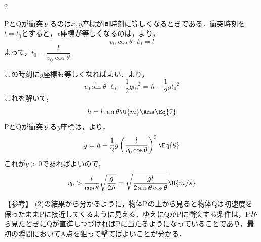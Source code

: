 \begin{multicols}{2}
\begin{komon}
 $\mathrm{P}$と$\mathrm{Q}$が衝突するのは$x,y$座標が同時刻に等しくなるときである．衝突時刻を$t=t_0$とすると，$x$座標が等しくなるのは，より，
       \[v_0\cos\theta\cdot t_0=l\]
       よって，$t_0=\dfrac{l}{v_0\cos\theta}$\par
       \hspace{1zw}この時刻に$y$座標も等しくなればよい．より，
       \[v_0\sin\theta\cdot t_0-\frac{1}{2}g{t_0}^2=h-\frac{1}{2}g{t_0}^2\]
       これを解いて，
       \[h=l\tan\theta\U{m}\Ans\Eq{7}\]
 $\mathrm{P}$と$\mathrm{Q}$が衝突する$y$座標は，より，
       \[y=h-\frac{1}{2}g\left(\frac{l}{v_0\cos\theta}\right)^2\Eq{8}\]
       これが$y>0$であればよいので，
       \[v_0>\frac{l}{\cos\theta}\sqrt{\frac{g}{2h}}=\sqrt{\frac{gl}{2\sin\theta\cos\theta}}\U{m/s}\]
       \hspace*{\fill}\Ans
\end{komon}
\begin{itembox}[l]{【参考】}
\hspace{1zw}(2)の結果から分かるように，物体$\mathrm{P}$の上から見ると物体$\mathrm{Q}$は初速度を保ったまま$\mathrm{P}$に接近してくるように見える．ゆえに$\mathrm{Q}$が$\mathrm{P}$に衝突する条件は，$\mathrm{P}$から見たときに$\mathrm{Q}$が直進しつづければ$\mathrm{P}$に当たるようになっていることであり，最初の瞬間において$\mathrm{A}$点を狙って撃てばよいことが分かる．
\end{itembox}

\end{multicols}
